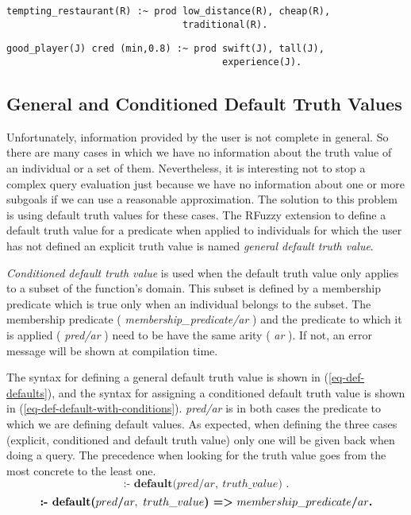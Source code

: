 \documentclass[runningheads,a4paper]{llncs}
\begin{document}
\begin{verbatim}
tempting_restaurant(R) :~ prod low_distance(R), cheap(R), 
                               traditional(R).
\end{verbatim}
\begin{verbatim}
good_player(J) cred (min,0.8) :~ prod swift(J), tall(J), 
                                      experience(J).
\end{verbatim}

\subsection{General and Conditioned Default Truth Values}
\label{general-and-conditioned-default-truth-values}

Unfortunately, information provided by the user is not complete in
general. So there are many cases in which we have no information about
the truth value of an individual or a set of them. Nevertheless, it is
interesting not to stop a complex query evaluation just because we
have no information about one or more subgoals if we can use a
reasonable approximation. The solution to this problem is using
default truth values for these cases. The RFuzzy extension to define a
default truth value for a predicate when applied to individuals for
which the user has not defined an explicit truth value is named {\it
general default truth value}.  

{\it Conditioned default truth value} is used when the default truth value 
only applies to a subset of the function's domain.
This subset is defined by a membership predicate which is true 
only when an individual belongs to the subset.
The membership predicate ( {\it membership\_predicate/ar} ) 
and the predicate to which it is applied ( {\it pred/ar} ) 
need to be have the same arity ( {\it ar} ). 
If not, an error message will be shown at compilation time.

The syntax for defining a general default truth value 
is shown in (\ref{eq-def-defaults}),
and the syntax for assigning a conditioned default truth value  
is shown in (\ref{eq-def-default-with-conditions}).
{\it pred/ar} is in both cases the predicate to which we are
defining default values.
As expected, when defining the three cases (explicit, conditioned
and default truth value) only one will be given back when doing
a query. The precedence when looking for the truth value 
goes from the most concrete to the least one.
\begin{equation}
\textbf{:- default(}pred\textbf{/}ar,\ truth\_value\textbf{)\ .}
\label{eq-def-defaults}
\end{equation}
\begin{equation}
  \textbf{:- default(}pred\textbf{/}ar,\ truth\_value \textbf{) =\textgreater}\ membership\_predicate\textbf{/}ar\textbf{.}
\label{eq-def-default-with-conditions}
\end{equation}
\end{document}
